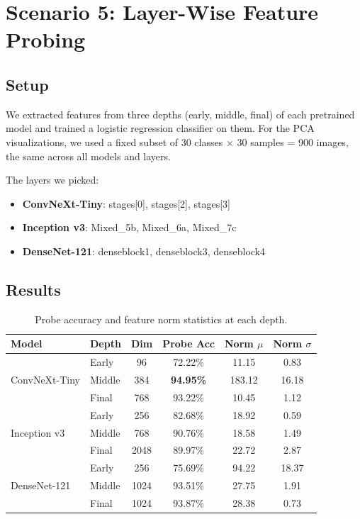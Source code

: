 \documentclass[11pt,a4paper]{article}
\begin{document}
\section{Scenario 5: Layer-Wise Feature Probing}

\subsection{Setup}
We extracted features from three depths (early, middle, final) of each pretrained model and trained a logistic regression classifier on them.
For the PCA visualizations, we used a fixed subset of 30 classes $\times$ 30 samples = 900 images, the same across all models and layers.

The layers we picked:
\begin{itemize}[nosep]
  \item \textbf{ConvNeXt-Tiny}: stages[0], stages[2], stages[3]
  \item \textbf{Inception v3}: Mixed\_5b, Mixed\_6a, Mixed\_7c
  \item \textbf{DenseNet-121}: denseblock1, denseblock3, denseblock4
\end{itemize}

\subsection{Results}

\begin{table}[H]
\centering
\caption{Probe accuracy and feature norm statistics at each depth.}
\label{tab:probing}
\begin{tabular}{llcccc}
\toprule
\textbf{Model} & \textbf{Depth} & \textbf{Dim} & \textbf{Probe Acc} & \textbf{Norm $\mu$} & \textbf{Norm $\sigma$} \\
\midrule
\multirow{3}{*}{ConvNeXt-Tiny}
  & Early  &   96 & 72.22\% & 11.15 & 0.83 \\
  & Middle &  384 & \textbf{94.95\%} & 183.12 & 16.18 \\
  & Final  &  768 & 93.22\% & 10.45 & 1.12 \\
\midrule
\multirow{3}{*}{Inception v3}
  & Early  &  256 & 82.68\% & 18.92 & 0.59 \\
  & Middle &  768 & 90.76\% & 18.58 & 1.49 \\
  & Final  & 2048 & 89.97\% & 22.72 & 2.87 \\
\midrule
\multirow{3}{*}{DenseNet-121}
  & Early  &  256 & 75.69\% & 94.22 & 18.37 \\
  & Middle & 1024 & 93.51\% & 27.75 & 1.91 \\
  & Final  & 1024 & 93.87\% & 28.38 & 0.73 \\
\bottomrule
\end{tabular}
\end{table}
\end{document}
